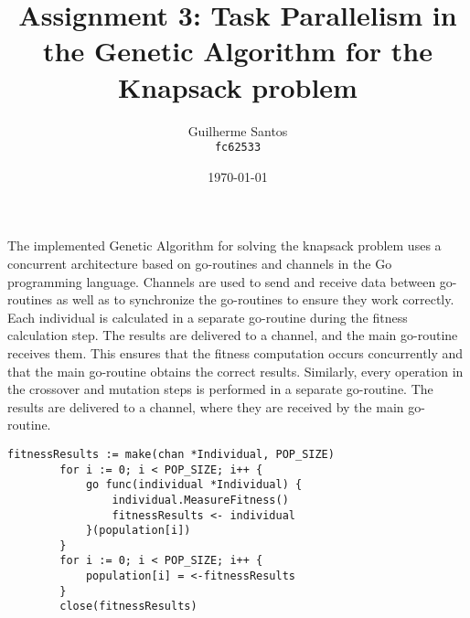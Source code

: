 \documentclass[11pt]{report}
\title{Assignment 3: Task Parallelism in the Genetic Algorithm for the Knapsack problem}
\author{Guilherme Santos      \\
\texttt{fc62533} 
\date{\today}
}
\begin{document}
\maketitle
{}


The implemented Genetic Algorithm for solving the knapsack problem uses a concurrent architecture based on go-routines and channels in the Go programming language. 
Channels are used to send and receive data between go-routines as well as to synchronize the go-routines to ensure they work correctly.
\\\indent Each individual is calculated in a separate go-routine during the fitness calculation step. The results are delivered to a channel, and the main go-routine receives them. This ensures that the fitness computation occurs concurrently and that the main go-routine obtains the correct results.
Similarly, every operation in the crossover and mutation steps is performed in a separate go-routine. The results are delivered to a channel, where they are received by the main go-routine.
\vspace{15pt}
\begin{lstlisting}[style=mystyle, caption={Fitness calculation step}, label={yourlabel}]
        fitnessResults := make(chan *Individual, POP_SIZE)
        for i := 0; i < POP_SIZE; i++ {
            go func(individual *Individual) {
                individual.MeasureFitness()
                fitnessResults <- individual
            }(population[i])
        }
        for i := 0; i < POP_SIZE; i++ {
            population[i] = <-fitnessResults
        }
        close(fitnessResults)
\end{lstlisting}
\vspace{30pt}
\end{document}
